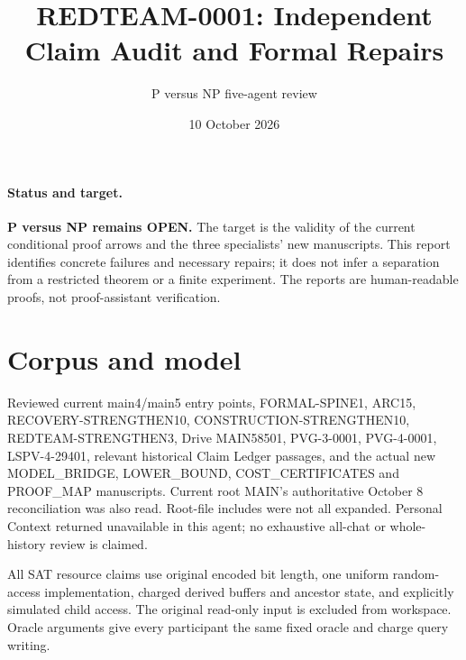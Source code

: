 \documentclass[11pt]{article}
\title{REDTEAM-0001: Independent Claim Audit and Formal Repairs}
\author{P versus NP five-agent review}
\date{10 October 2026}
\begin{document}
\sloppy\maketitle
\paragraph{Status and target.}
\textbf{P versus NP remains OPEN.} The target is the validity of the current
conditional proof arrows and the three specialists' new manuscripts.
This report identifies concrete failures and necessary repairs; it does not
infer a separation from a restricted theorem or a finite experiment.
The reports are human-readable proofs, not proof-assistant verification.

\section*{Corpus and model}
Reviewed current main4/main5 entry points, FORMAL-SPINE1, ARC15,
RECOVERY-STRENGTHEN10, CONSTRUCTION-STRENGTHEN10, REDTEAM-STRENGTHEN3,
Drive MAIN58501, PVG-3-0001, PVG-4-0001, LSPV-4-29401, relevant historical
Claim Ledger passages, and the actual new MODEL\_BRIDGE, LOWER\_BOUND,
COST\_CERTIFICATES and PROOF\_MAP manuscripts. Current root MAIN's
authoritative October 8 reconciliation was also read. Root-file includes
were not all expanded. Personal Context returned unavailable in this agent;
no exhaustive all-chat or whole-history review is claimed.

All SAT resource claims use original encoded bit length, one uniform
random-access implementation, charged derived buffers and ancestor state,
and explicitly simulated child access. The original read-only input is
excluded from workspace. Oracle arguments give every participant the same
fixed oracle and charge query writing.
\end{document}
